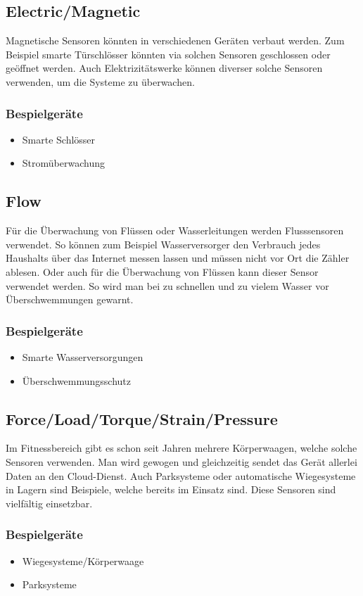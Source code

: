 \subsection{Electric/Magnetic}
Magnetische Sensoren könnten in verschiedenen Geräten verbaut werden. Zum Beispiel smarte Türschlösser könnten via solchen Sensoren geschlossen oder geöffnet werden. Auch Elektrizitätswerke können diverser solche Sensoren verwenden, um die Systeme zu überwachen.
\subsubsection{Bespielgeräte}
\begin{itemize}
\item	Smarte Schlösser
\item	Stromüberwachung
\end{itemize}


\subsection{Flow}%
Für die Überwachung von Flüssen oder Wasserleitungen werden Flusssensoren verwendet. So können zum Beispiel Wasserversorger den Verbrauch jedes Haushalts über das Internet messen lassen und müssen nicht vor Ort die Zähler ablesen. Oder auch für die Überwachung von Flüssen kann dieser Sensor verwendet werden. So wird man bei zu schnellen und zu vielem Wasser vor Überschwemmungen gewarnt.
\subsubsection{Bespielgeräte}
\begin{itemize}
\item	Smarte Wasserversorgungen
\item	Überschwemmungsschutz
\end{itemize}


\subsection{Force/Load/Torque/Strain/Pressure}%
Im Fitnessbereich gibt es schon seit Jahren mehrere Körperwaagen, welche solche Sensoren verwenden. Man wird gewogen und gleichzeitig sendet das Gerät allerlei Daten an den Cloud-Dienst. Auch Parksysteme oder automatische Wiegesysteme in Lagern sind Beispiele, welche bereits im Einsatz sind. Diese Sensoren sind vielfältig einsetzbar.
\subsubsection{Bespielgeräte}
\begin{itemize}
\item	Wiegesysteme/Körperwaage
\item	Parksysteme
\end{itemize}


